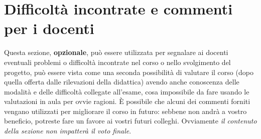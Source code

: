 \section{Difficoltà incontrate e commenti per i docenti}

Questa sezione, \textbf{opzionale}, può essere utilizzata per segnalare ai docenti eventuali problemi o difficoltà incontrate nel corso o nello svolgimento del progetto, può essere vista come una seconda possibilità di valutare il corso (dopo quella offerta dalle rilevazioni della didattica) avendo anche conoscenza delle modalità e delle difficoltà collegate all'esame, cosa impossibile da fare usando le valutazioni in aula per ovvie ragioni.
%
È possibile che alcuni dei commenti forniti vengano utilizzati per migliorare il corso in futuro: sebbene non andrà a vostro beneficio, potreste fare un favore ai vostri futuri colleghi.
%
Ovviamente \textit{il contenuto della sezione non impatterà il voto finale}.